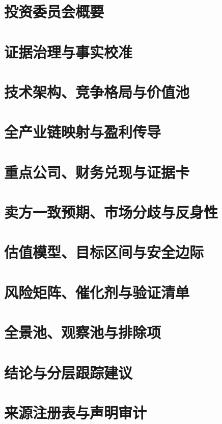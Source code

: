 \documentclass[a4paper,11pt,openany,fontset=none]{ctexrep}
\begin{document}
\astockcover
\tableofcontents
\clearpage

\chapter{投资委员会概要}

\chapter{证据治理与事实校准}

\chapter{技术架构、竞争格局与价值池}

\chapter{全产业链映射与盈利传导}

\chapter{重点公司、财务兑现与证据卡}

\chapter{卖方一致预期、市场分歧与反身性}

\chapter{估值模型、目标区间与安全边际}

\chapter{风险矩阵、催化剂与验证清单}

\chapter{全景池、观察池与排除项}

\chapter{结论与分层跟踪建议}


\appendix
\chapter{来源注册表与声明审计}

\end{document}
